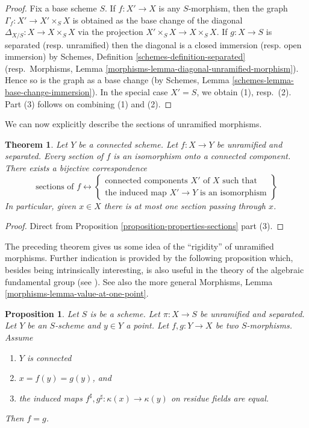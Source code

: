 \documentclass{stacks-project}
\theoremstyle{plain}
\newtheorem{theorem}[subsection]{Theorem}
\newtheorem{proposition}[subsection]{Proposition}
\theoremstyle{definition}
\theoremstyle{remark}
\numberwithin{equation}{subsection}
\begin{document}
\begin{proof}
Fix a base scheme $S$.
If $f : X' \to X$ is any $S$-morphism, then the graph
$\Gamma_f : X' \to X' \times_S X$
is obtained as the base change of the diagonal
$\Delta_{X/S} : X \to X \times_S X$ via the projection
$X' \times_S X \to X \times_S X$.
If $g : X \to S$ is separated (resp. unramified)
then the diagonal is a closed immersion (resp. open immersion)
by Schemes, Definition \ref{schemes-definition-separated}
(resp.\ Morphisms, Lemma \ref{morphisms-lemma-diagonal-unramified-morphism}).
Hence so is the graph as a base change (by
Schemes, Lemma \ref{schemes-lemma-base-change-immersion}).
In the special case $X' = S$, we obtain (1), resp.\ (2).
Part (3) follows on combining (1) and (2).
\end{proof}

\noindent
We can now explicitly describe the sections of unramified morphisms.

\begin{theorem}
\label{theorem-sections-unramified-maps}
Let $Y$ be a connected scheme.
Let $f : X \to Y$ be unramified and separated.
Every section of $f$ is an isomorphism onto a connected component.
There exists a bijective correspondence
$$
\text{sections of }f
\leftrightarrow
\left\{
\begin{matrix}
\text{connected components }X'\text{ of }X\text{ such that}\\
\text{the induced map }X' \to Y\text{ is an isomorphism}
\end{matrix}
\right\}
$$
In particular, given $x \in X$ there is at most one
section passing through $x$.
\end{theorem}

\begin{proof}
Direct from Proposition \ref{proposition-properties-sections} part (3).
\end{proof}

\noindent
The preceding theorem gives us some idea of the ``rigidity'' of unramified
morphisms. Further indication is provided by the following proposition
which, besides being intrinsically interesting, is also useful in the
theory of the algebraic fundamental group (see \cite[Expos\'e V]{SGA1}).
See also the more general
Morphisms, Lemma \ref{morphisms-lemma-value-at-one-point}.

\begin{proposition}
\label{proposition-equality}
Let $S$ is be a scheme.
Let $\pi : X \to S$ be unramified and separated.
Let $Y$ be an $S$-scheme and $y \in Y$ a point.
Let $f, g : Y \to X$ be two $S$-morphisms. Assume
\begin{enumerate}
\item $Y$ is connected
\item $x = f(y) = g(y)$, and
\item the induced maps $f^\sharp, g^\sharp : \kappa(x) \to \kappa(y)$
on residue fields are equal.
\end{enumerate}
Then $f = g$.
\end{proposition}
\end{document}
